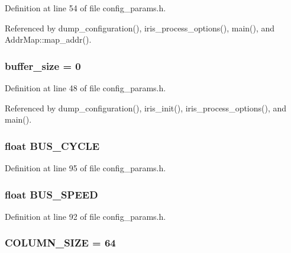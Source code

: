 Definition at line 54 of file config\_\-params.h.

Referenced by dump\_\-configuration(), iris\_\-process\_\-options(), main(), and AddrMap::map\_\-addr().
\subsubsection[{buffer\_\-size}]{ {\bf buffer\_\-size} = 0}\label{config__params_8h_c9ed472f13d0eb7f926e286e05bfbcc7}




Definition at line 48 of file config\_\-params.h.

Referenced by dump\_\-configuration(), iris\_\-init(), iris\_\-process\_\-options(), and main().
\subsubsection[{BUS\_\-CYCLE}]{\setlength{\rightskip}{0pt plus 5cm}float {\bf BUS\_\-CYCLE}}\label{config__params_8h_6905232b437897dbbc50631f4592275e}




Definition at line 95 of file config\_\-params.h.
\subsubsection[{BUS\_\-SPEED}]{\setlength{\rightskip}{0pt plus 5cm}float {\bf BUS\_\-SPEED}}\label{config__params_8h_97f1347e6a89939a723b3cdd452c76cb}




Definition at line 92 of file config\_\-params.h.
\subsubsection[{COLUMN\_\-SIZE}]{ {\bf COLUMN\_\-SIZE} = 64}\label{config__params_8h_f0596ae8862443e137eb225092bffad6}




